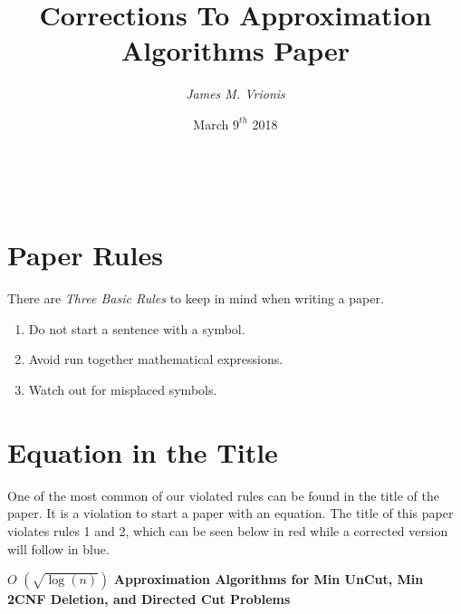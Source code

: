 \documentclass[11pt]{article}
\begin{document}
\title{\textbf{Corrections To Approximation Algorithms Paper}}\\
\author{\textit{James M. Vrionis}
        \date{March $9^{th}$ 2018}
       }

\maketitle
\hline


\section{Paper Rules}
There are \textit{Three Basic Rules} to keep in mind when writing
a paper.  
\begin{enumerate}
\item Do {\color{red}not} start a sentence with a symbol.
\item Avoid {\color{red}run together} mathematical expressions.
\item Watch out for {\color{red}misplaced symbols}.
\end{enumerate}

\section{Equation in the Title}



One of the most common of our violated rules can be found in the 
title of the paper. It is a violation to start a paper with an 
equation.  The title of this paper violates rules 1 and 2, which
can be seen below in {\color{red}red} while a corrected version 
will follow in {\color{blue}blue}.\\ 

\begin{center}
{\color{red}$O$ $\left( \sqrt{\log(n)}\right)$} \textbf{Approximation Algorithms 
for Min UnCut, Min 2CNF Deletion, and Directed Cut Problems}
\end{center}

\end{document}
